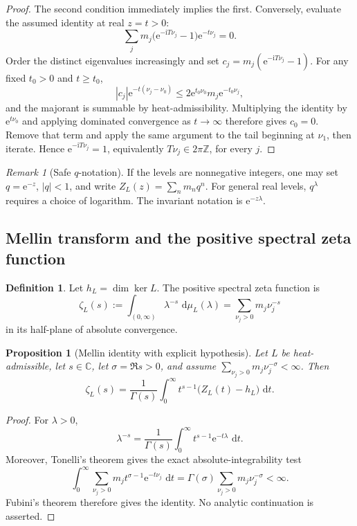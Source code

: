 \documentclass[11pt,a4paper]{article}
\newtheorem{proposition}[theorem]{Proposition}
\theoremstyle{definition}
\newtheorem{definition}[theorem]{Definition}
\theoremstyle{remark}
\newtheorem{remark}[theorem]{Remark}
\newcommand{\C}{\mathbb C}
\newcommand{\Z}{\mathbb Z}
\newcommand{\e}{\mathrm e}
\newcommand{\ii}{\mathrm i}
\newcommand{\dd}{\,\mathrm d}
\newcommand{\abs}[1]{\left\lvert #1\right\rvert}
\begin{document}
\begin{proof}
The second condition immediately implies the first. Conversely, evaluate the
assumed identity at real \(z=t>0\):
\[
 \sum_jm_j\bigl(\e^{-\ii T\nu_j}-1\bigr)\e^{-t\nu_j}=0.
\]
Order the distinct eigenvalues increasingly and set
\(c_j=m_j(\e^{-\ii T\nu_j}-1)\). For any fixed \(t_0>0\) and \(t\geq t_0\),
\[
 \abs{c_j}\e^{-t(\nu_j-\nu_0)}
 \leq 2\e^{t_0\nu_0}m_j\e^{-t_0\nu_j},
\]
and the majorant is summable by heat-admissibility. Multiplying the identity
by \(\e^{t\nu_0}\) and applying dominated convergence as \(t\to\infty\)
therefore gives \(c_0=0\). Remove that term and apply the same argument to
the tail beginning at \(\nu_1\), then iterate. Hence
\(\e^{-\ii T\nu_j}=1\), equivalently \(T\nu_j\in2\pi\Z\), for every \(j\).
\end{proof}

\begin{remark}[Safe \(q\)-notation]
If the levels are nonnegative integers, one may set \(q=\e^{-z}\), \(\abs q<1\),
and write \(Z_L(z)=\sum_nm_nq^n\). For general real levels, \(q^\lambda\)
requires a choice of logarithm. The invariant notation is
\(\e^{-z\lambda}\).
\end{remark}

\subsection{Mellin transform and the positive spectral zeta function}

\begin{definition}
Let \(h_L=\dim\ker L\). The positive spectral zeta function is
\[
 \zeta_L(s):=\int_{(0,\infty)}\lambda^{-s}\,\dd\mu_L(\lambda)
            =\sum_{\nu_j>0}m_j\nu_j^{-s}
\]
in its half-plane of absolute convergence.
\end{definition}

\begin{proposition}[Mellin identity with explicit hypothesis]
\label{prop:mellin}
Let \(L\) be heat-admissible, let \(s\in\C\), let
\(\sigma=\Re s>0\), and assume
\(\sum_{\nu_j>0}m_j\nu_j^{-\sigma}<\infty\). Then
\[
  \zeta_L(s)
  =\frac{1}{\Gamma(s)}
    \int_0^\infty t^{s-1}\bigl(Z_L(t)-h_L\bigr)\,\dd t.
\]
\end{proposition}

\begin{proof}
For \(\lambda>0\),
\[
 \lambda^{-s}=\frac1{\Gamma(s)}
 \int_0^\infty t^{s-1}\e^{-t\lambda}\,\dd t.
\]
Moreover, Tonelli's theorem gives the exact absolute-integrability test
\[
 \int_0^\infty
 \sum_{\nu_j>0}m_jt^{\sigma-1}\e^{-t\nu_j}\,\dd t
 =
 \Gamma(\sigma)\sum_{\nu_j>0}m_j\nu_j^{-\sigma}<\infty.
\]
Fubini's theorem therefore gives the identity. No analytic continuation is
asserted.
\end{proof}
\end{document}

